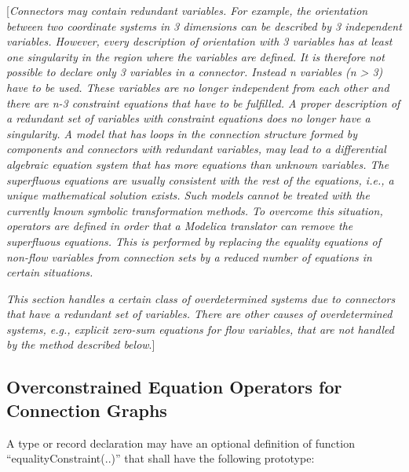 \documentclass[10pt,a4paper]{report}
\def\doublelabel#1{\label{#1}}
\begin{document}
{[}\emph{Connectors may contain redundant variables. For example, the
orientation between two coordinate systems in 3 dimensions can be
described by 3 independent variables. However, every description of
orientation with 3 variables has at least one singularity in the region
where the variables are defined. It is therefore not possible to declare
only 3 variables in a connector. Instead n variables (n \textgreater{}
3) have to be used. These variables are no longer independent from each
other and there are n-3 constraint equations that have to be fulfilled.
A proper description of a redundant set of variables with constraint
equations does no longer have a singularity. A model that has loops in
the connection structure formed by components and connectors with
redundant variables, may lead to a differential algebraic equation
system that has more equations than unknown variables. The superfluous
equations are usually consistent with the rest of the equations, i.e., a
unique mathematical solution exists. Such models cannot be treated with
the currently known symbolic transformation methods. To overcome this
situation, operators are defined in order that a Modelica translator can
remove the superfluous equations. This is performed by replacing the
equality equations of non-flow variables from connection sets by a
reduced number of equations in certain situations.}

\emph{This section handles a certain class of overdetermined systems due
to connectors that have a redundant set of variables. There are other
causes of overdetermined systems, e.g., explicit zero-sum equations for
flow variables, that are not handled by the method described below}.{]}

\subsection{Overconstrained Equation Operators for Connection Graphs}\doublelabel{overconstrained-equation-operators-for-connection-graphs}

A type or record declaration may have an optional definition of function
``equalityConstraint(..)'' that shall have the following prototype:
\end{document}
